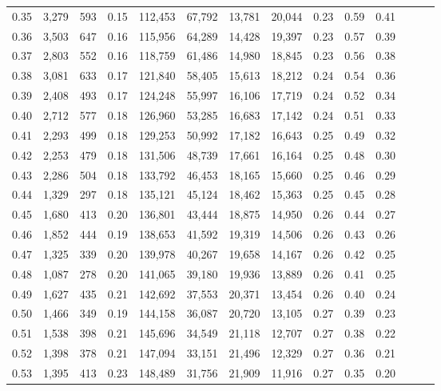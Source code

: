 \begin{tabular}{rrrrrrrrrrrrrr}
0.35 &  3,279 &  593 &  0.15 &  112,453 &   67,792 &  13,781 &  20,044 &  0.23 &  0.59 &      0.41 \\
0.36 &  3,503 &  647 &  0.16 &  115,956 &   64,289 &  14,428 &  19,397 &  0.23 &  0.57 &      0.39 \\
0.37 &  2,803 &  552 &  0.16 &  118,759 &   61,486 &  14,980 &  18,845 &  0.23 &  0.56 &      0.38 \\
0.38 &  3,081 &  633 &  0.17 &  121,840 &   58,405 &  15,613 &  18,212 &  0.24 &  0.54 &      0.36 \\
0.39 &  2,408 &  493 &  0.17 &  124,248 &   55,997 &  16,106 &  17,719 &  0.24 &  0.52 &      0.34 \\
0.40 &  2,712 &  577 &  0.18 &  126,960 &   53,285 &  16,683 &  17,142 &  0.24 &  0.51 &      0.33 \\
0.41 &  2,293 &  499 &  0.18 &  129,253 &   50,992 &  17,182 &  16,643 &  0.25 &  0.49 &      0.32 \\
0.42 &  2,253 &  479 &  0.18 &  131,506 &   48,739 &  17,661 &  16,164 &  0.25 &  0.48 &      0.30 \\
0.43 &  2,286 &  504 &  0.18 &  133,792 &   46,453 &  18,165 &  15,660 &  0.25 &  0.46 &      0.29 \\
0.44 &  1,329 &  297 &  0.18 &  135,121 &   45,124 &  18,462 &  15,363 &  0.25 &  0.45 &      0.28 \\
0.45 &  1,680 &  413 &  0.20 &  136,801 &   43,444 &  18,875 &  14,950 &  0.26 &  0.44 &      0.27 \\
0.46 &  1,852 &  444 &  0.19 &  138,653 &   41,592 &  19,319 &  14,506 &  0.26 &  0.43 &      0.26 \\
0.47 &  1,325 &  339 &  0.20 &  139,978 &   40,267 &  19,658 &  14,167 &  0.26 &  0.42 &      0.25 \\
0.48 &  1,087 &  278 &  0.20 &  141,065 &   39,180 &  19,936 &  13,889 &  0.26 &  0.41 &      0.25 \\
0.49 &  1,627 &  435 &  0.21 &  142,692 &   37,553 &  20,371 &  13,454 &  0.26 &  0.40 &      0.24 \\
0.50 &  1,466 &  349 &  0.19 &  144,158 &   36,087 &  20,720 &  13,105 &  0.27 &  0.39 &      0.23 \\
0.51 &  1,538 &  398 &  0.21 &  145,696 &   34,549 &  21,118 &  12,707 &  0.27 &  0.38 &      0.22 \\
0.52 &  1,398 &  378 &  0.21 &  147,094 &   33,151 &  21,496 &  12,329 &  0.27 &  0.36 &      0.21 \\
0.53 &  1,395 &  413 &  0.23 &  148,489 &   31,756 &  21,909 &  11,916 &  0.27 &  0.35 &      0.20 \\

\end{tabular}
